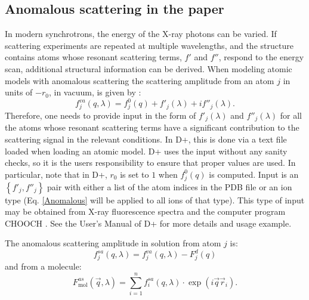 \documentclass[12pt,a4paper,openany,oneside,oldfontcommands]{memoir}
\begin{document}
\subsection{Anomalous scattering in the paper}
\label{sec:AnomScat}
In modern synchrotrons, the energy of the X-ray photons can be varied. If scattering experiments are repeated at multiple wavelengths, and the structure contains atoms whose resonant scattering terms, $f'$ and $f''$, respond to the energy scan, additional structural information can be derived. When modeling atomic models with anomalous scattering the scattering amplitude from an atom $j$ in units of $-r_0$, in vacuum, is given by \cite{als2011elements}:  
\begin{equation}
f^{va}_j\left(q, \lambda\right) = f^{0}_j\left(q\right) + f'_j\left(\lambda\right) + if''_j\left(\lambda\right).
\label{Anomalous}
\end{equation}
Therefore, one needs to provide input in the form of $f'_j\left(\lambda\right)$ and $f''_j\left(\lambda\right)$ for all the atoms whose resonant scattering terms have a significant contribution to the scattering signal in the relevant conditions.
In D+, this is done via a text file loaded when loading an atomic model.
D+ uses the input without any sanity checks, so it is the users responsibility to ensure that proper values are used. In particular, note that in D+, $r_0$ is set to $1$ when $f^{0}_j\left(q\right)$ is computed. 
Input is an $\left\lbrace f'_j, f''_j\right\rbrace$ pair with either a list of the atom indices in the PDB file or an ion type (Eq. \ref{Anomalous} will be applied to all ions of that type).
This type of input may be obtained from X-ray fluorescence spectra and the computer program CHOOCH \cite{evans2001chooch}. See the User's Manual of D+ for more details and usage example.

The anomalous scattering amplitude in solution from atom $j$ is: 
\begin{equation*}
f_j^{sa}\left(q,\lambda\right)=f^{va}_j(q,\lambda)-F^d_j(q)
\end{equation*}
and from a molecule:
\begin{equation*}
F^{as}_{\text{mol}}\left(\vec{q},\lambda\right)=\sum_{i=1}^n f_{i}^{sa}\left(q,\lambda\right)\cdot \exp\left(i\vec{q}\vec{r}_i\right).
\end{equation*}
	
	
	
\end{document}
